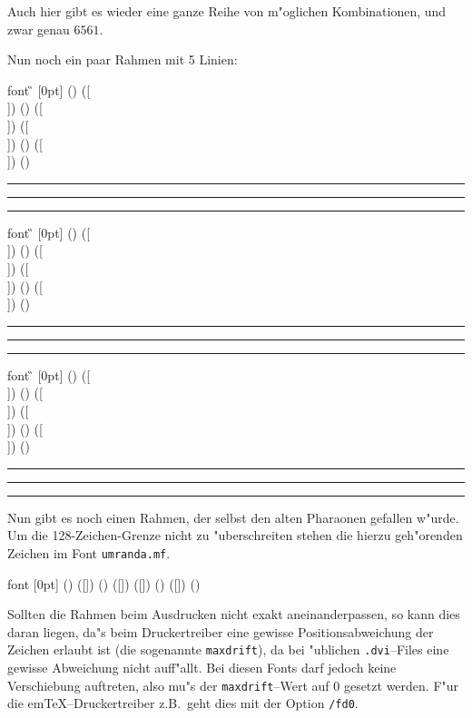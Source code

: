 \vskip2mm
Auch hier gibt es wieder eine ganze Reihe von m"oglichen Kombinationen,
und zwar genau $6561$.

\newpage

Nun noch ein paar Rahmen mit 5 Linien:\\[1mm]
{
\def\make{
          \vskip 2mm
		  \hrule
          
		  \vskip 2mm\hrule\hrule\vskip 1mm}
\begin{bsp}
         font {\G} [0pt]
         ()    ([\\])     ()
         ([\\])  ([\\])
         ()    ([\\])     ()
\end{bsp}
\make

\begin{bsp}
         font {\G} [0pt]
         ()    ([\\])     ()
         ([\\])  ([\\])
         ()    ([\\])     ()
\end{bsp}
\make

\begin{bsp}
         font {\G} [0pt]
         ()    ([\\])     ()
         ([\\])  ([\\])
         ()    ([\\])     ()
\end{bsp}
\make

}

Nun gibt es noch einen Rahmen, der selbst den alten Pharaonen gefallen
w"urde. Um die 128-Zeichen-Grenze nicht zu "uberschreiten stehen die hierzu
geh"orenden Zeichen im Font {\tt umranda.mf}.
\begin{bsp}
         font {\F} [0pt]
         () ([]) ()
         ([])         ([])
         () ([]) ()
\end{bsp}
\make


\vskip2mm
Sollten die Rahmen beim Ausdrucken nicht exakt aneinanderpassen, so kann
dies daran liegen, da"s beim Druckertreiber eine gewisse Positionsabweichung
der Zeichen erlaubt ist (die sogenannte {\tt maxdrift}), da bei "ublichen
{\tt .dvi}--Files eine gewisse Abweichung nicht auff"allt. Bei diesen Fonts
darf jedoch keine Verschiebung auftreten, also mu"s der {\tt maxdrift}--Wert
auf 0 gesetzt werden. F"ur die em\TeX--Druckertreiber z.B.\ geht dies mit
der Option {\tt /fd0}.
\endinput
